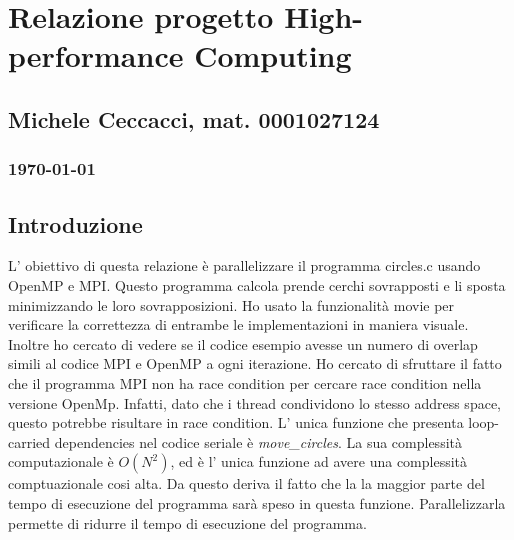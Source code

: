 \documentclass[a4paper,11pt, twoside]{report}
\begin{document}
\section*{Relazione progetto High-performance Computing}
\subsection*{Michele Ceccacci, mat. 0001027124}
\subsubsection*{\today}

\subsection*{Introduzione}
L' obiettivo di questa relazione è parallelizzare il programma circles.c usando OpenMP e MPI.
Questo programma calcola prende cerchi sovrapposti e li sposta minimizzando le loro sovrapposizioni.
Ho usato la funzionalità movie per verificare la correttezza di entrambe le implementazioni in maniera visuale.
Inoltre ho cercato di vedere se il codice esempio avesse un numero di overlap simili al codice MPI e OpenMP a ogni iterazione.
Ho cercato di sfruttare il fatto che il programma MPI non ha race condition per cercare race condition nella versione OpenMp.
Infatti, dato che i thread condividono lo stesso address space, questo potrebbe risultare in race condition.
L' unica funzione che presenta loop-carried dependencies nel codice seriale è \textit{move\_circles}.
La sua complessità computazionale è $O(N^2)$, ed è l' unica funzione ad avere una complessità comptuazionale cosi alta.
Da questo deriva il fatto che la la maggior parte del tempo di esecuzione del programma sarà speso in questa funzione.
Parallelizzarla permette di ridurre il tempo di esecuzione del programma.
\end{document}
